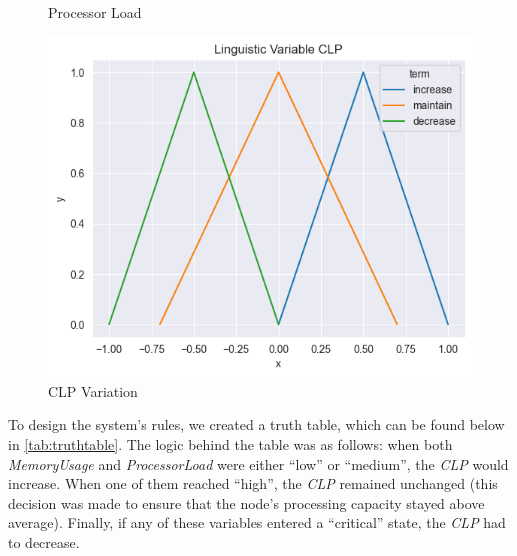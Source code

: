 \documentclass[titlepage]{article}
\begin{document}
\begin{figure}[htbp]
\begin{minipage}{0.32\textwidth}
        \caption{Processor Load}
        \label{fig:memory_usage}
    \end{minipage}
    \hfill
    \begin{minipage}{0.32\textwidth}
        \centering
        \includegraphics[width=\textwidth]{../images/triangular_CLP}
        \caption{CLP Variation}
        \label{fig:clp}
    \end{minipage}
\end{figure}


To design the system's rules, we created a truth table, which can be found below in \cref{tab:truthtable}.
The logic behind the table was as follows: when both \textit{MemoryUsage} and \textit{ProcessorLoad} were either ``low'' or ``medium'', the \textit{CLP} would increase.
When one of them reached ``high'', the \textit{CLP} remained unchanged (this decision was made to ensure that the node's processing capacity stayed above average).
Finally, if any of these variables entered a ``critical'' state, the \textit{CLP} had to decrease.
\end{document}
